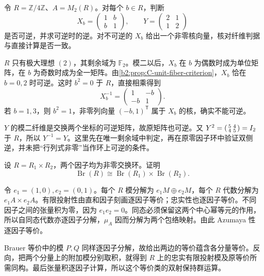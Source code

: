\begin{exercise}\label{b2:ex:C-unit-fibers}
	令 \(R=\mathbb Z/4\mathbb Z\)、\(A=M_2(R)\)。对每个 \(b\in R\)，判断
	\[
		X_b=\begin{pmatrix}1&b\\b&1\end{pmatrix},\qquad
		Y=\begin{pmatrix}2&1\\1&2\end{pmatrix}
	\]
	是否可逆，并求可逆时的逆。对不可逆的 \(X_b\) 给出一个非零核向量，核对纤维判据与直接计算是否一致。
\end{exercise}
\begin{solution}
	\(R\) 只有极大理想 \((2)\)，其剩余域为 \(\mathbb F_2\)。模二以后，\(X_b\) 在 \(b\) 为偶数时成为单位矩阵，在 \(b\) 为奇数时成为全一矩阵。由\cref{b2:prop:C-unit-fiber-criterion}，\(X_b\) 恰在 \(b=0,2\) 时可逆。这时 \(b^2=0\) 于 \(R\)，直接相乘得到
	\[
		X_b^{-1}=\begin{pmatrix}1&-b\\-b&1\end{pmatrix}.
	\]
	若 \(b=1,3\)，则 \(b^2=1\)，非零列向量 \((-b,1)^{\mathsf T}\) 属于 \(X_b\) 的核，确实不能可逆。

	\(Y\) 的模二纤维是交换两个坐标的可逆矩阵，故原矩阵也可逆。又 \(Y^2=\begin{psmallmatrix}5&4\\4&5\end{psmallmatrix}=I_2\) 于 \(R\)，所以 \(Y^{-1}=Y\)。这里先在唯一剩余域中判定，再在原零因子环中验证双侧逆，并未把“行列式非零”当作环上可逆的条件。
\end{solution}

\begin{exercise}\label{b2:ex:C-product-brauer}
	设 \(R=R_1\times R_2\)，两个因子均为非零交换环。证明
	\[
		\operatorname{Br}(R)\cong\operatorname{Br}(R_1)\times\operatorname{Br}(R_2).
	\]
\end{exercise}
\begin{solution}
	令 \(e_1=(1,0),e_2=(0,1)\)。每个 \(R\) 模分解为 \(e_1M\oplus e_2M\)，每个 \(R\) 代数分解为 \(e_1A\times e_2A\)。有限投射性由直和因子刻画逐因子等价；忠实性也逐因子等价。不同因子之间的张量积为零，因为 \(e_1e_2=0\)。同态必须保留这两个中心幂等元的作用，所以自同态代数亦逐因子分解，\(\mu_A\) 因而分解为两个包络映射。由此 Azumaya 性逐因子等价。

	Brauer 等价中的模 \(P,Q\) 同样逐因子分解，故给出两边的等价蕴含各分量等价。反向，把两个分量上的附加模分别取积，就得到 \(R\) 上的忠实有限投射模及原等价所需同构。最后张量积逐因子计算，所以这个等价类的双射保持群运算。
\end{solution}


